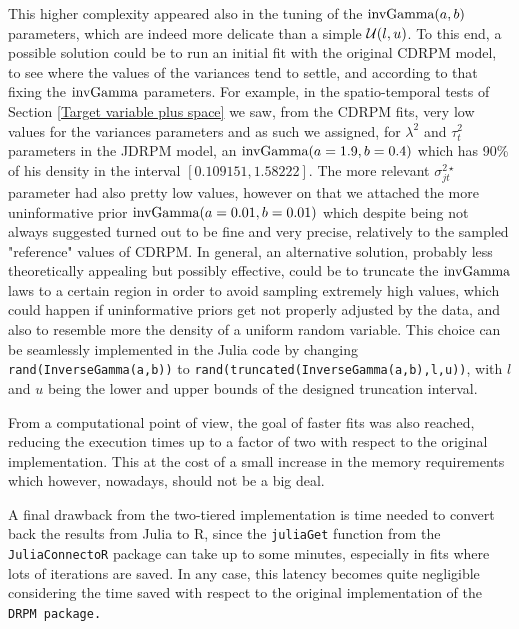 \documentclass[12pt,	%
	a4paper,		%
	twoside,		%
	openright,		%
	titlepage,%
	]{book}
\theoremstyle{definition}
\newcommand{\mjline}[1]{\texttt{#1}}
\begin{document}
This higher complexity appeared also in the tuning of the $\text{invGamma}(a,b)$ parameters, which are indeed more delicate than a simple $\mathcal{U}(l,u)$. To this end, a possible solution could be to run an initial fit with the original CDRPM model, to see where the values of the variances tend to settle, and according to that fixing the $\text{invGamma}$ parameters. For example, in the spatio-temporal tests of Section \ref{Target variable plus space} we saw, from the CDRPM fits, very low values for the variances parameters and as such we assigned, for $\lambda^2$ and $\tau^2_t$ parameters in the JDRPM model, an $\text{invGamma}(a=1.9, b=0.4)$ which has 90\% of his density in the interval $[0.109151, 1.58222]$. The more relevant $\sigma^{2\star}_{jt}$ parameter had also pretty low values, however on that we attached the more uninformative prior $\text{invGamma}(a=0.01, b=0.01)$ which despite being not always suggested \cite{paper-28-prior-variance} turned out to be fine and very precise, relatively to the sampled "reference" values of CDRPM. In general, an alternative solution, probably less theoretically appealing but possibly effective, could be to truncate the $\text{invGamma}$ laws to a certain region in order to avoid sampling extremely high values, which could happen if uninformative priors get not properly adjusted by the data, and also to resemble more the density of a uniform random variable. This choice can be seamlessly implemented in the Julia code by changing \mjline{rand(InverseGamma(a,b))} to \mjline{rand(truncated(InverseGamma(a,b),l,u))}, with $l$ and $u$ being the lower and upper bounds of the designed truncation interval.

From a computational point of view, the goal of faster fits was also reached, reducing the execution times up to a factor of two with respect to the original implementation. This at the cost of a small increase in the memory requirements which however, nowadays, should not be a big deal. 

A final drawback from the two-tiered implementation is time needed to convert back the results from Julia to R, since the \mjline{juliaGet} function from the \mjline{JuliaConnectoR} package can take up to some minutes, especially in fits where lots of iterations are saved. In any case, this latency becomes quite negligible considering the time saved with respect to the original implementation of the \tt{DRPM} package. 
\end{document}

